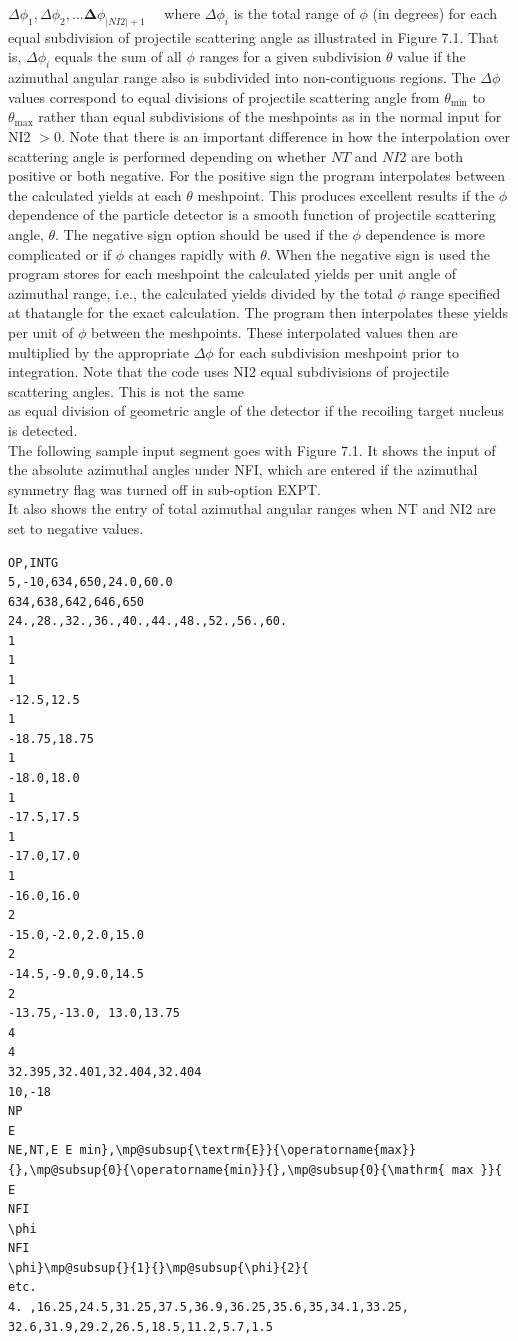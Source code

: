 \documentclass[10pt]{article}
\begin{document}
$\Delta \phi_{1}, \Delta \phi_{2}, \ldots \boldsymbol{\Delta} \phi_{|N I 2|+1} \quad$ where $\Delta \phi_{i}$ is the total range of $\phi$ (in degrees) for each equal subdivision of projectile scattering angle as illustrated in Figure 7.1. That is, $\Delta \phi_{i}$ equals the sum of all $\phi$ ranges for a given subdivision $\theta$ value if the azimuthal angular range also is subdivided into non-contiguous regions. The $\Delta \phi$ values correspond to equal divisions of projectile scattering angle from $\theta_{\min }$ to $\theta_{\max }$ rather than equal subdivisions of the meshpoints as in the normal input for NI2 $>0$. Note that there is an important difference in how the interpolation over scattering angle is performed depending on whether $N T$ and $N I 2$ are both positive or both negative. For the positive sign the program interpolates between the calculated yields at each $\theta$ meshpoint. This produces excellent results if the $\phi$ dependence of the particle detector is a smooth function of projectile scattering angle, $\theta$. The negative sign option should be used if the $\phi$ dependence is more complicated or if $\phi$ changes rapidly with $\theta$. When the negative sign is used the program stores for each meshpoint the calculated yields per unit angle of azimuthal range, i.e., the calculated yields divided by the total $\phi$ range specified at thatangle for the exact calculation. The program then interpolates these yields per unit of $\phi$ between the meshpoints. These interpolated values then are multiplied by the appropriate $\Delta \phi$ for each subdivision meshpoint prior to integration. Note that the code uses NI2 equal subdivisions of projectile scattering angles. This is not the same\\
as equal division of geometric angle of the detector if the recoiling target nucleus is detected.\\
The following sample input segment goes with Figure 7.1. It shows the input of the absolute azimuthal angles under NFI, which are entered if the azimuthal symmetry flag was turned off in sub-option EXPT.\\
It also shows the entry of total azimuthal angular ranges when NT and NI2 are set to negative values.

\begin{verbatim}
OP,INTG
5,-10,634,650,24.0,60.0
634,638,642,646,650
24.,28.,32.,36.,40.,44.,48.,52.,56.,60.
1
1
1
-12.5,12.5
1
-18.75,18.75
1
-18.0,18.0
1
-17.5,17.5
1
-17.0,17.0
1
-16.0,16.0
2
-15.0,-2.0,2.0,15.0
2
-14.5,-9.0,9.0,14.5
2
-13.75,-13.0, 13.0,13.75
4
4
32.395,32.401,32.404,32.404
10,-18
NP
E
NE,NT,E E min},\mp@subsup{\textrm{E}}{\operatorname{max}}{},\mp@subsup{0}{\operatorname{min}}{},\mp@subsup{0}{\mathrm{ max }}{
E
NFI
\phi
NFI
\phi}\mp@subsup{}{1}{}\mp@subsup{\phi}{2}{
etc.
4. ,16.25,24.5,31.25,37.5,36.9,36.25,35.6,35,34.1,33.25,
32.6,31.9,29.2,26.5,18.5,11.2,5.7,1.5
\end{verbatim}
\end{document}
